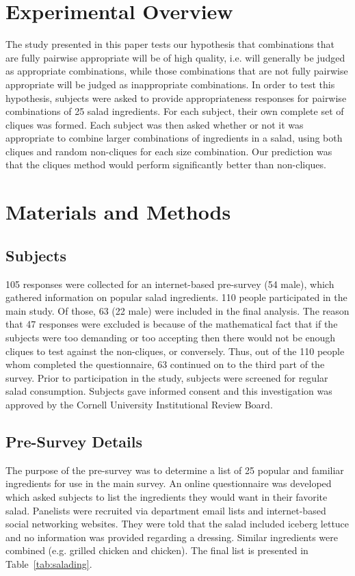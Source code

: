 \section{Experimental Overview}
The study presented in this paper tests our hypothesis that combinations that are fully pairwise appropriate will be of high quality, i.e. will generally be judged as appropriate combinations, while those combinations that are not fully pairwise appropriate will be judged as inappropriate combinations.  In order to test this hypothesis, subjects were asked to provide appropriateness responses for pairwise combinations of 25 salad ingredients.  For each subject, their own complete set of cliques was formed.  Each subject was then asked whether or not it was appropriate to combine larger combinations of ingredients in a salad, using both cliques and random non-cliques for each size combination.  Our prediction was that the cliques method would perform significantly better than non-cliques.  

\section{Materials and Methods}
\subsection{Subjects}
105 responses were collected for an internet-based pre-survey (54 male), which gathered information on popular salad ingredients.  110 people participated in the main study.  Of those, 63 (22 male) were included in the final analysis.  The reason that 47 responses were excluded is because of the mathematical fact that if the subjects were too demanding or too accepting then there would not be enough cliques to test against the non-cliques, or conversely.  Thus, out of the 110 people whom completed the questionnaire, 63 continued on to the third part of the survey.  Prior to participation in the study, subjects were screened for regular salad consumption.  Subjects gave informed consent and this investigation was approved by the Cornell University Institutional Review Board.

\subsection{Pre-Survey Details}
The purpose of the pre-survey was to determine a list of 25 popular and familiar ingredients for use in the main survey.  An online questionnaire was developed which asked subjects to list the ingredients they would want in their favorite salad.  Panelists were recruited via department email lists and internet-based social networking websites. They were told that the salad included iceberg lettuce and no information was provided regarding a dressing.  Similar ingredients were combined (e.g. grilled chicken and chicken).  The final list is presented in Table~\ref{tab:salading}.


